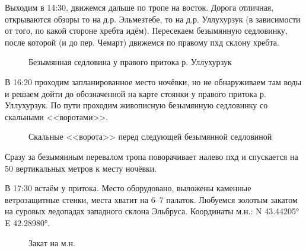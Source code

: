 Выходим в 14:30, движемся дальше по тропе на восток. Дорога отличная, открываются обзоры то на д.р. Эльмезтебе, то на д.р. Уллухурзук (в зависимости от того, по какой стороне хребта идём). Пересекаем безымянную седловинку, после которой (и до пер. Чемарт) движемся по правому пхд склону хребта.

\begin{figure}[h!]
	\centering
	\caption{Безымянная седловина у правого притока р. Уллухурзук}
	\label{fig:saddle}
\end{figure}


В 16:20 проходим запланированное место ночёвки, но не обнаруживаем там воды и решаем дойти до обозначенной на карте стоянки у правого притока р. Уллухурзук. По пути проходим живописную безымянную седловинку со скальными <<воротами>>.

\begin{figure}[h!]
	\centering
	\caption{Скальные <<ворота>> перед следующей безымянной седловиной}
	\label{fig:gate}
\end{figure}
 
Сразу за безымянным перевалом тропа поворачивает налево пхд и спускается на 50 вертикальных метров к месту ночёвки.

В 17:30 встаём у притока. Место оборудовано, выложены каменные ветрозащитные стенки, места хватит на 6--7 палаток. Любуемся золотым закатом на суровых ледопадах западного склона Эльбруса. Координаты м.н.: N 43.44205° E 42.28980°.

\begin{figure}[h!]
	\centering
	\caption{Закат на м.н.}
	\label{fig:camp06}
\end{figure}

\clearpage